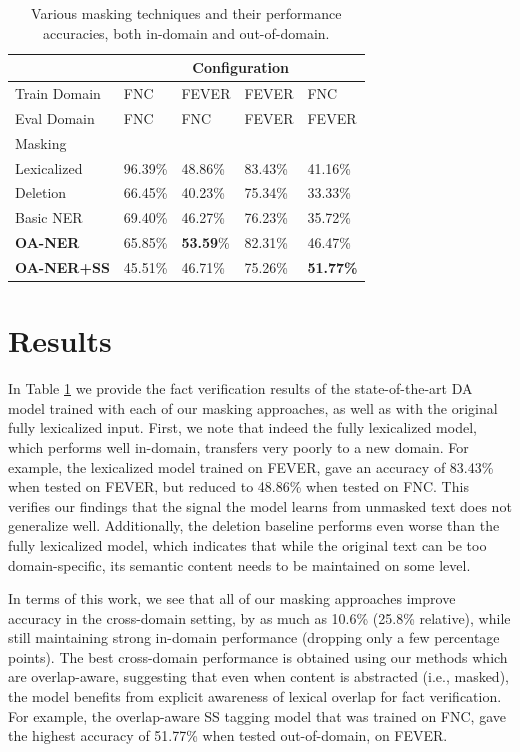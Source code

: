 \begin{table}[ht]
\begin{center}
\begin{tabular}{p{22mm}|p{9mm}p{9mm}p{9mm}p{9mm}}
 & \multicolumn{4}{c}{Configuration} \\
 \hline
Train Domain & {FNC}& {FEVER}  & {FEVER} & {{FNC}} \\
Eval Domain & {FNC}& {{FNC}}  & {FEVER} & {{FEVER}} \\ \hline
Masking & & & & \\
\hline
Lexicalized &96.39\%& {48.86\%} &83.43\%& {41.16\%} \\
Deletion  &66.45\%& 40.23\% &75.34\%& 33.33\% \\
Basic NER &69.40\%& 46.27\% &76.23\%& 35.72\%\\
\textbf{OA-NER} &65.85\%& \textbf{53.59}\% &{82.31\%}& {46.47\%}\\
\textbf{OA-NER+SS} & 45.51\%& 46.71\% &75.26\%& {\bf 51.77\%}\\
\end{tabular}
\end{center}
    \caption{\label{crossdomain} Various masking techniques and their performance accuracies, both in-domain and out-of-domain.} \label{tab:results}

\end{table}

\section{Results}
\label{sec:results}

In Table \ref{tab:results} we provide the fact verification results of the state-of-the-art DA model trained with each of our masking approaches, as well as with the original fully lexicalized input.
First, we note that indeed the fully lexicalized model, which performs well in-domain, transfers very poorly to a new domain.
For example, the lexicalized model trained on FEVER,  gave an accuracy of 83.43\% when tested on FEVER, but reduced to 48.86\% when tested on FNC.
This verifies our findings that the signal the model learns from unmasked text does not generalize well.
Additionally, the deletion baseline performs even worse than the fully lexicalized model, which indicates that while the original text can be too domain-specific, its semantic content needs to be maintained on some level.

In terms of this work, we see that all of our masking approaches improve accuracy in the cross-domain setting, by as much as 10.6\% (25.8\% relative), while still maintaining strong in-domain performance (dropping only a few percentage points).
The best cross-domain performance is obtained using our methods which are overlap-aware, suggesting that even when content is abstracted (i.e., masked), the model benefits from explicit awareness of lexical overlap for fact verification. For example, the overlap-aware SS tagging model that was trained on FNC, gave the highest accuracy of 51.77\% when tested out-of-domain, on FEVER.

